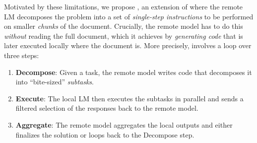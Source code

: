 Motivated by these limitations, we propose \system, an extension of \naive where the remote LM decomposes the problem into a set of \emph{single-step instructions} to be performed on smaller \emph{chunks} of the document.
Crucially, the remote model has to do this \textit{without} reading the full document, which it achieves by \textit{generating code} that is later executed locally where the document is.
% 
% 
% 
% 
More precisely, \system involves a loop over three steps:
\begin{enumerate}
    \item \textbf{Decompose}: Given a task, the remote model writes code that decomposes it into ``bite-sized'' \textit{subtasks}.
    \item \textbf{Execute}: The local LM then executes the subtasks in parallel and sends a filtered selection of the responses back to the remote model.
    \item \textbf{Aggregate}: The remote model aggregates the local outputs and either finalizes the solution or loops back to the Decompose step.
\end{enumerate}

